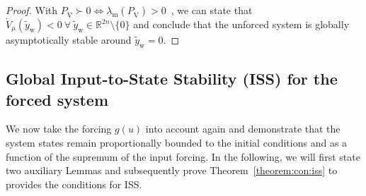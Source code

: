 \begin{proof}
    With $P_{\dot{\mathrm{V}}} \succ 0 \Leftrightarrow \lambda_\mathrm{m}\left(P_{\dot{\mathrm{V}}} \right) > 0$~\citep{golub2013matrix}, we can state that $\dot{V}_\mu(\tilde{y}_\mathrm{w}) < 0 \: \forall \: \tilde{y}_\mathrm{w} \in \mathbb{R}^{2n} \setminus \{0 \}$ and conclude that the unforced system is globally asymptotically stable around $\tilde{y}_\mathrm{w} = 0$.
\end{proof}

\subsection{Global Input-to-State Stability (ISS) for the forced system} 
We now take the forcing $g(u)$ into account again and demonstrate that the system states remain proportionally bounded to the initial conditions and as a function of the supremum of the input forcing.
In the following, we will first state two auxiliary Lemmas and subsequently prove Theorem~\ref{theorem:con:iss} to provides the conditions for \gls{ISS}.

